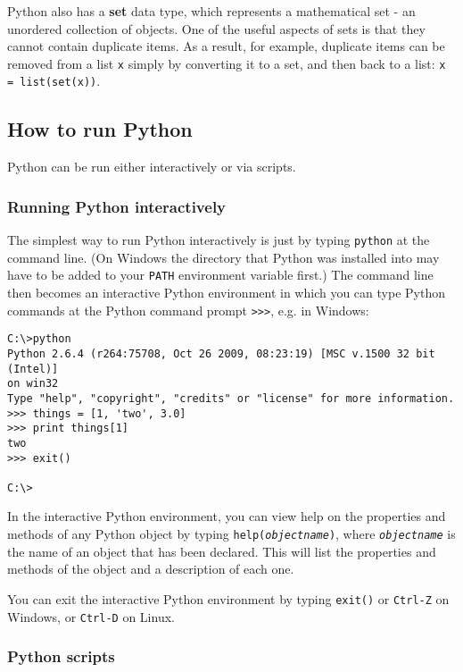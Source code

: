 Python also has a \textbf{set} data type, which represents a mathematical set - an unordered collection of objects.  One of the useful aspects of sets is that they cannot contain duplicate items.  As a result, for example, duplicate items can be removed from a list \texttt{x} simply by converting it to a set, and then back to a list: \texttt{x = list(set(x))}.

\subsection{How to run Python}

Python can be run either interactively or via scripts.

\subsubsection{Running Python interactively}
\label{python_interactive}

The simplest way to run Python interactively is just by typing \texttt{python} at the command line.  (On Windows the directory that Python was installed into may have to be added to your \texttt{PATH} environment variable first.) The command line then becomes an interactive Python environment in which you can type Python commands at the Python command prompt \texttt{>>>}, e.g. in Windows:

\begin{verbatim}
C:\>python
Python 2.6.4 (r264:75708, Oct 26 2009, 08:23:19) [MSC v.1500 32 bit (Intel)]
on win32
Type "help", "copyright", "credits" or "license" for more information.
>>> things = [1, 'two', 3.0]
>>> print things[1]
two
>>> exit()

C:\>
\end{verbatim}

In the interactive Python environment, you can view help on the properties and methods of any Python object by typing \texttt{help(\emph{objectname})}, where \texttt{\emph{objectname}} is the name of an object that has been declared.  This will list the properties and methods of the object and a description of each one.

You can exit the interactive Python environment by typing \texttt{exit()} or \texttt{Ctrl-Z} on Windows, or \texttt{Ctrl-D} on Linux.

\subsubsection{Python scripts}

